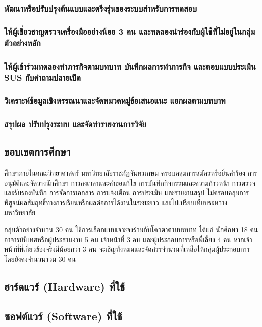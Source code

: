 \documentclass[17pt,a4paper,oneside]{extarticle}
\begin{document}
\subsubsection{พัฒนาหรือปรับปรุงต้นแบบและตรึงรุ่นของระบบสำหรับการทดสอบ}
\subsubsection{ให้ผู้เชี่ยวชาญตรวจเครื่องมืออย่างน้อย 3 คน และทดลองนำร่องกับผู้ใช้ที่ไม่อยู่ในกลุ่มตัวอย่างหลัก}
\subsubsection{ให้ผู้เข้าร่วมทดลองทำภารกิจตามบทบาท บันทึกผลการทำภารกิจ และตอบแบบประเมิน SUS กับคำถามปลายเปิด}
\subsubsection{วิเคราะห์ข้อมูลเชิงพรรณนาและจัดหมวดหมู่ข้อเสนอแนะ แยกผลตามบทบาท}
\subsubsection{สรุปผล ปรับปรุงระบบ และจัดทำรายงานการวิจัย}

\subsection{ขอบเขตการศึกษา}
ศึกษาภายในคณะวิทยาศาสตร์ มหาวิทยาลัยราชภัฏจันทรเกษม ครอบคลุมการสมัครหรือยื่นคำร้อง การอนุมัติและจัดวางนักศึกษา การลงเวลาและคำขอแก้ไข การบันทึกกิจกรรมและความก้าวหน้า การตรวจและรับรองบันทึก การจัดการเอกสาร การแจ้งเตือน การประเมิน และรายงานสรุป ไม่ครอบคลุมการพิสูจน์ผลสัมฤทธิ์ทางการเรียนหรือผลต่อการได้งานในระยะยาว และไม่เปรียบเทียบระหว่างมหาวิทยาลัย

กลุ่มตัวอย่างจำนวน 30 คน ใช้การเลือกแบบเจาะจงร่วมกับโควตาตามบทบาท ได้แก่ นักศึกษา 18 คน อาจารย์นิเทศหรือ\mbox{ผู้ประสานงาน} 5 คน เจ้าหน้าที่ 3 คน และผู้ประกอบการหรือพี่เลี้ยง 4 คน หากเจ้าหน้าที่ที่เกี่ยวข้องจริงมีน้อยกว่า 3 คน จะเชิญทั้งหมดและจัดสรรจำนวนที่เหลือให้กลุ่มผู้ประกอบการ โดยยังคงจำนวนรวม 30 คน

\clearpage
\subsection{ฮาร์ดแวร์ (Hardware) ที่ใช้}
\proposalhardware

\subsection{ซอฟต์แวร์ (Software) ที่ใช้}
\proposalsoftware
\end{document}

